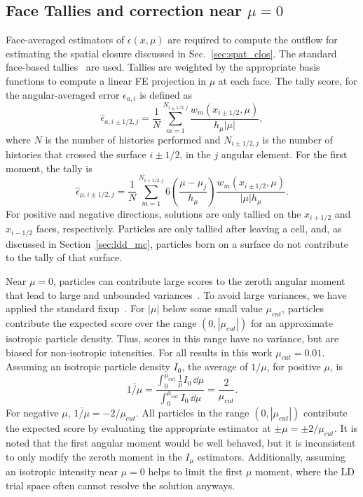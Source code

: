 \subsection{Face Tallies and correction near $\mu=0$}
\label{sec:face_tallies}

Face-averaged estimators of $\epsilon(x,\mu)$ are required to compute the outflow for
estimating the spatial closure discussed in Sec.~\ref{sec:spat_clos}. The standard face-based
tallies~\cite{shultis_mc,favorite_faces} are used.  Tallies are weighted by
the appropriate basis functions to compute a linear FE projection in $\mu$ at each face.  The
tally score, for the angular-averaged error $\epsilon_{a,i}$ is defined as
\begin{equation}
    \hat \epsilon_{a,i\pm1/2,j} = \frac{1}{N} \sum_{m=1}^{N_{i\pm1/2,j}}
    \frac{w_m(x_{i\pm1/2},\mu)}{h_{\mu} |\mu|},
\end{equation}
where $N$ is the number of histories performed and $N_{i\pm1/2,j}$ is the number of histories
that crossed the surface $i\pm1/2$, in the $j$ angular element.   For the first
moment, the tally is
\begin{equation}\label{eq:face_mutally}
    \hat \epsilon_{\mu,i\pm1/2,j} = \frac{1}{N} \sum_{m=1}^{N_{i+1/2,j}} 
    6\left(\frac{\mu-\mu_j}{h_\mu}\right) \frac{w_m(x_{i\pm1/2},\mu)}{|\mu| h_{\mu}}.
\end{equation}
For positive and negative directions, solutions are only tallied
on the $x_{i+1/2}$ and $x_{i-1/2}$ faces, respectively. Particles are only tallied after leaving
a cell, and, as discussed in Section~\ref{sec:ldd_mc}, particles born on a surface do not contribute
to the tally of that surface.

Near $\mu=0$, particles can contribute large scores to the zeroth angular moment that lead to large and
unbounded variances~\cite{favorite_faces}.  To avoid large variances, we have applied the standard fixup~\cite{mcnp,favorite_faces}.  
For $|\mu|$ below some small value $\mu_{cut}$, 
particles contribute the expected score over the range $(0,|\mu_{cut}|)$ for an
approximate isotropic particle density. Thus, scores in this range have no variance, but are biased
for non-isotropic intensities.  For all results in this work $\mu_{cut}=0.01$.  Assuming
an isotropic particle density $I_0$, the average of
$1/\mu$, for positive $\mu$, is
\begin{equation}
    \overline{1/\mu} = \frac{\displaystyle \int_0^{\mu_{cut}}\frac{1}{\mu} I_0 \,\dd
\mu}{\displaystyle \int_0^{\mu_{cut}} I_0\, \dd \mu} =
    \frac{2}{\mu_{cut}}.
\end{equation}
For negative $\mu$, $\overline{1/\mu}=-2/\mu_{cut}$.
All particles in the range $(0,|\mu_{cut}|)$ contribute the expected score by evaluating
the appropriate estimator at $\pm\mu = \pm2/\mu_{cut}$.  It is noted that the first angular moment would be well behaved, but it is inconsistent to only modify the zeroth 
moment in the $I_\mu$ estimators. Additionally, assuming an isotropic intensity near $\mu=0$ helps to limit
the first $\mu$ moment, where the LD trial space often cannot resolve the solution anyways.




